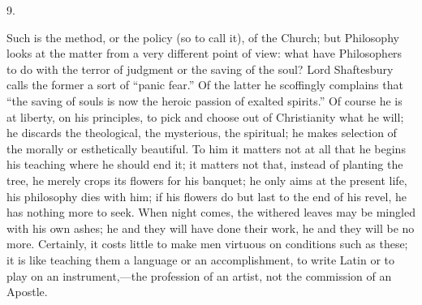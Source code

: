9.

Such is the method, or the policy (so to call it), of the Church;
but Philosophy looks at the matter from a very different point of
view: what have Philosophers to do with the terror of judgment or the
saving of the soul? Lord Shaftesbury calls the former a sort of
``panic fear.'' Of the latter he scoffingly complains that
``the saving of souls is now the heroic passion of exalted
spirits.'' Of course he is at liberty, on his principles, to pick
and choose out of Christianity what he will; he discards the
theological, the mysterious, the spiritual; he makes selection of the
morally or esthetically beautiful. To him it matters not at all that
he begins his teaching where he should end it; it matters not that,
instead of planting the tree, he merely crops its flowers for his
banquet; he only aims at the present life, his philosophy dies with
him; if his flowers do but last to the end of his revel, he has
nothing more to seek. When night comes, the withered leaves may be
mingled with his own ashes; he and they will have done their work, he
and they will be no more. Certainly, it costs little to make men
virtuous on conditions such as these; it is like teaching them a
language or an accomplishment, to write Latin or to play on an
instrument,—the profession of an artist, not the commission of an
Apostle.

